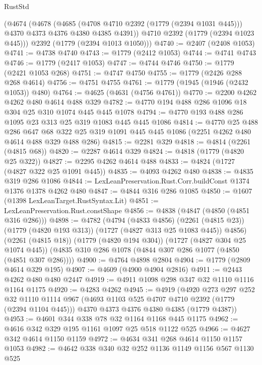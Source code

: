 \begin{lexlean}{RustStd}
\begin{coremodule}
      (@4674
        (@4678
          (@4685
            (@4708 @4710 @2392 (@1779 (@2394 @1031 @445)))
            @4370
            @4373
            @4376
            @4380
            @4385
            @4391))
        @4710
        @2392
        (@1779 (@2394 @1023 @445)))
      @2392
      (@1779 (@2394 @1013 @1050)))
@4740 := @2407 (@2408 @1053)
@4741 := @4738 @4740
@4743 := @1779 (@2412 @1053)
@4744 := @4741 @4743
@4746 := @1779 (@2417 @1053)
@4747 := @4744 @4746
@4750 := @1779 (@2421 @1053 @268)
@4751 := @4747 @4750
@4755 := @1779 (@2426 @288 @268 @4614)
@4756 := @4751 @4755
@4761 := @1779 (@1945 (@1946 (@2432 @1053)) @480)
@4764 := @4625 (@4631 (@4756 @4761))
@4770 := @2200 @4262 @4262 @480 @4614 @488 @329
@4782 := @4770 @194 @488 @286 @1096 @18 @304 @25 @310 @1074 @445 @445 @1078
@4794 := @4770 @193 @488 @286 @1095 @23 @313 @25 @319 @1083 @445 @445 @1086
@4814 := @4770
    @25
    @488
    @286
    @647
    @68
    @322
    @25
    @319
    @1091
    @445
    @445
    @1086
    (@2251 @4262 @480 @4614 @488 @329 @488 @286)
@4815 := @2281 @329
@4818 := @4814 (@2261 (@4815 @68))
@4820 := @2287 @4614 @329
@4824 := @4818 (@1779 (@4820 @25 @322))
@4827 := @2295 @4262 @4614 @488
@4833 := @4824 (@1727 (@4827 @322 @25 @1091 @445))
@4835 := @4093 @4262 @480
@4838 := @4835 @319 @286 @1086
@4844 := LexLeanPreservation.Rust.Corr.buildConst @1374 @1376 @1378 @4262 @480
@4847 := @4844 @316 @286 @1085
@4850 := @1607 (@1398 LexLeanTarget.RustSyntax.Lit)
@4851 := LexLeanPreservation.Rust.constShape
@4856 := @4838 (@4847 (@4850 (@4851 @316 @286)))
@4898 := @4782
    (@4794
      (@4833 @4856)
      (@2261 (@4815 @23))
      (@1779 (@4820 @193 @313))
      (@1727 (@4827 @313 @25 @1083 @445))
      @4856)
    (@2261 (@4815 @18))
    (@1779 (@4820 @194 @304))
    (@1727 (@4827 @304 @25 @1074 @445))
    (@4835 @310 @286 @1078 (@4844 @307 @286 @1077 (@4850 (@4851 @307 @286))))
@4900 := @4764 @4898 @2804
@4904 := @1779 (@2809 @4614 @329 @195)
@4907 := @4609 (@4900 @4904 @2816)
@4911 := @2443 @4262 @480 @480 @2447
@4919 := @4911 @1098 @298 @347 @32 @1110 @1116 @1164 @1175
@4920 := @4283 @4262
@4945 := @4919
    (@4920
      @273
      @297
      @252
      @32
      @1110
      @1114
      @967
      (@4693 @1103 @525 @4707 @4710 @2392 (@1779 (@2394 @1104 @445)))
      @4370
      @4373
      @4376
      @4380
      @4385
      (@1779 @4387))
@4953 := @4601 @344 @338 @78 @32 @1164 @1168 @445 @1175
@4962 := @4616 @342 @329 @195 @1161 @1097 @25 @518 @1122 @525
@4966 := @4627 @342 @4614 @1150 @1159
@4972 := @4634 @341 @268 @4614 @1150 @1157 @1053
@4982 := @4642 @338 @340 @32 @252 @1136 @1149 @1156 @567 @1130 @525

\end{coremodule}
\end{lexlean}
